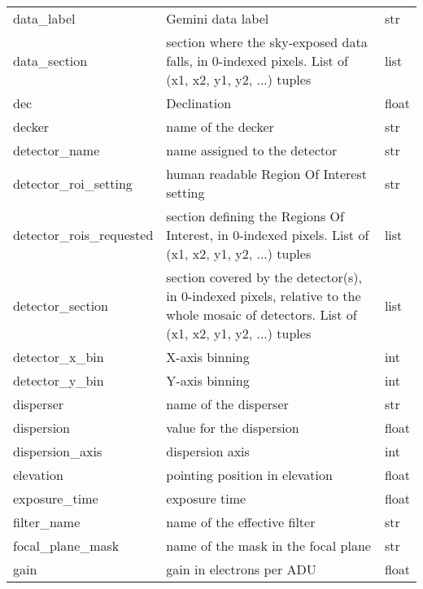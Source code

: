 \documentclass[letterpaper,10pt,english]{sphinxmanual}
\begin{document}
\begin{longtable}{|l|p{3.0in}|l|}
data\_label
 & 
Gemini data label
 & 
str
\\

data\_section
 & 
section where the sky-exposed data falls, in 0-indexed pixels.
List of (x1, x2, y1, y2, ...) tuples
 & 
list
\\

dec
 & 
Declination
 & 
float
\\

decker
 & 
name of the decker
 & 
str
\\

detector\_name
 & 
name assigned to the detector
 & 
str
\\

detector\_roi\_setting
 & 
human readable Region Of Interest setting
 & 
str
\\

detector\_rois\_requested
 & 
section defining the Regions Of Interest, in 0-indexed pixels.
List of (x1, x2, y1, y2, ...) tuples
 & 
list
\\

detector\_section
 & 
section covered by the detector(s), in 0-indexed pixels,
relative to the whole mosaic of detectors.
List of (x1, x2, y1, y2, ...) tuples
 & 
list
\\

detector\_x\_bin
 & 
X-axis binning
 & 
int
\\

detector\_y\_bin
 & 
Y-axis binning
 & 
int
\\

disperser
 & 
name of the disperser
 & 
str
\\

dispersion
 & 
value for the dispersion
 & 
float
\\

dispersion\_axis
 & 
dispersion axis
 & 
int
\\

elevation
 & 
pointing position in elevation
 & 
float
\\

exposure\_time
 & 
exposure time
 & 
float
\\

filter\_name
 & 
name of the effective filter
 & 
str
\\

focal\_plane\_mask
 & 
name of the mask in the focal plane
 & 
str
\\

gain
 & 
gain in electrons per ADU
 & 
float
\\


\end{longtable}
\end{document}
